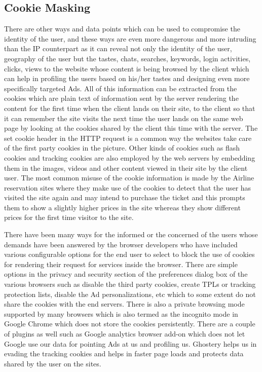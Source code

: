 \documentclass[10pt, a4paper, twocolumn]{article} %
\begin{document}
\subsection{Cookie Masking}

There are other ways and data points which can be used to compromise the identity of the user, and these ways are even more dangerous and more intruding than the IP counterpart as it can reveal not only the identity of the user, geography of the user but the tastes, chats, searches, keywords, login activities, clicks, views to the website whose content is being browsed by the client which can help in profiling the users based on his/her tastes and designing even more specifically targeted Ads. All of this information can be extracted from the cookies which are plain text of information sent by the server rendering the content for the first time when the client lands on their site, to the client so that it can remember the site visits the next time the user lands on the same web page by looking at the cookies shared by the client this time with the server. The set cookie header in the HTTP request is a common way the websites take care of the first party cookies in the picture.\newline
Other kinds of cookies such as flash cookies and tracking cookies are also employed by the web servers by embedding them in the images, videos and other content viewed in their site by the client user. The most common misuse of the cookie information is made by the Airline reservation sites where they make use of the cookies to detect that the user has visited the site again and may intend to purchase the ticket and this prompts them to show a slightly higher prices in the site whereas they show different prices for the first time visitor to the site.\newline

There have been many ways for the informed or the concerned of the users whose demands have been answered by the browser developers who have included various configurable options for the end user to select to block the use of cookies for rendering their request for services inside the browser. There are simple options in the privacy and security section of the preferences dialog box of the various browsers such as disable the third party cookies, create TPLs or tracking protection lists, disable the Ad personalizations, etc which to some extent do not share the cookies with the end servers. There is also a private browsing mode supported by many browsers which is also termed as the incognito mode in Google Chrome which does not store the cookies persistently. There are a couple of plugins as well such as Google analytics browser add-on which does not let Google use our data for pointing Ads at us and profiling us. Ghostery helps us in evading the tracking cookies and helps in faster page loads and protects data shared by the user on the sites.\newline
\end{document}
